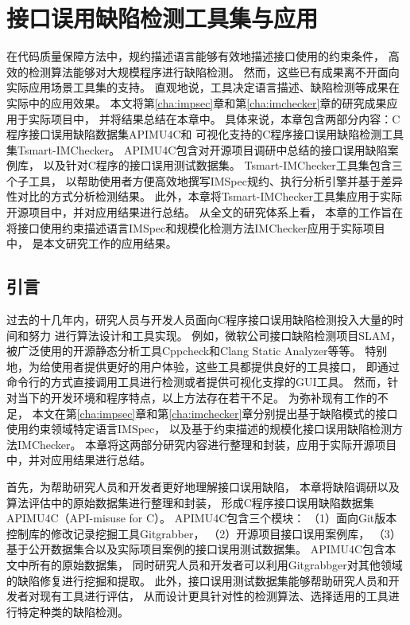 \chapter{接口误用缺陷检测工具集与应用}
\label{cha:tools}
在代码质量保障方法中，规约描述语言能够有效地描述接口使用的约束条件，
高效的检测算法能够对大规模程序进行缺陷检测。
然而，这些已有成果离不开面向实际应用场景工具集的支持。
直观地说，工具决定语言描述、缺陷检测等成果在实际中的应用效果。
本文将第\ref{cha:impsec}章和第\ref{cha:imchecker}章的研究成果应用于实际项目中，
并将结果总结在本章中。
具体来说，本章包含两部分内容：C程序接口误用缺陷数据集APIMU4C和
可视化支持的C程序接口误用缺陷检测工具集Tsmart-IMChecker。
APIMU4C包含对开源项目调研中总结的接口误用缺陷案例库，
以及针对C程序的接口误用测试数据集。
Tsmart-IMChecker工具集包含三个子工具，
以帮助使用者方便高效地撰写IMSpec规约、执行分析引擎并基于差异性对比的方式分析检测结果。
此外，本章将Tsmart-IMChecker工具集应用于实际开源项目中，并对应用结果进行总结。
从全文的研究体系上看，
本章的工作旨在将接口使用约束描述语言IMSpec和规模化检测方法IMChecker应用于实际项目中，
是本文研究工作的应用结果。

\section{引言}
过去的十几年内，研究人员与开发人员面向C程序接口误用缺陷检测投入大量的时间和努力
进行算法设计和工具实现。
例如，微软公司接口缺陷检测项目SLAM，
被广泛使用的开源静态分析工具Cppcheck和Clang Static Analyzer等等。
特别地，为给使用者提供更好的用户体验，这些工具都提供良好的工具接口，
即通过命令行的方式直接调用工具进行检测或者提供可视化支撑的GUI工具。
然而，针对当下的开发环境和程序特点，以上方法存在若干不足。
为弥补现有工作的不足，
本文在第\ref{cha:impsec}章和第\ref{cha:imchecker}章分别提出基于缺陷模式的接口使用约束领域特定语言IMSpec，
以及基于约束描述的规模化接口误用缺陷检测方法IMChecker。
本章将这两部分研究内容进行整理和封装，应用于实际开源项目中，并对应用结果进行总结。

首先，为帮助研究人员和开发者更好地理解接口误用缺陷，
本章将缺陷调研以及算法评估中的原始数据集进行整理和封装，
形成C程序接口误用缺陷数据集APIMU4C（API-misuse for C）。
APIMU4C包含三个模块：
（1）面向Git版本控制库的修改记录挖掘工具Gitgrabber，
（2）开源项目接口误用案例库，
（3）基于公开数据集合以及实际项目案例的接口误用测试数据集。
APIMU4C包含本文中所有的原始数据集，
同时研究人员和开发者可以利用Gitgrabbger对其他领域的缺陷修复进行挖掘和提取。
此外，接口误用测试数据集能够帮助研究人员和开发者对现有工具进行评估，
从而设计更具针对性的检测算法、选择适用的工具进行特定种类的缺陷检测。



